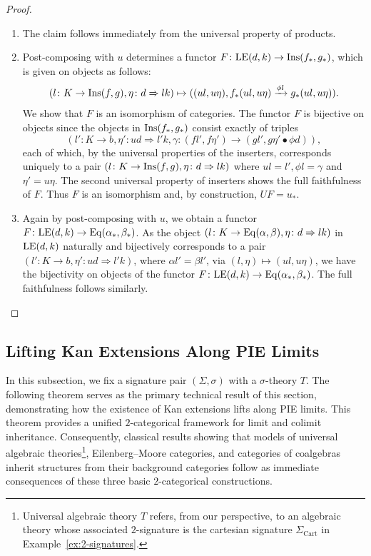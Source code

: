 \begin{proof}
    \hfill
    \begin{enumerate}
        \item The claim follows immediately from the universal property of products.
        \item Post-composing with $u$ determines a functor $F\colon \mathrm{LE}(d,k)\to \mathrm{Ins}(f_*,g_*)$, which is given on objects as follows: 
        $$
        (l\colon K\to \mathrm{Ins}(f,g),\eta\colon d\Rightarrow lk)\mapsto ((ul,u\eta), f_*(ul,u\eta)\xrightarrow{\phi l} g_*(ul,u\eta)).
        $$
        We show that $F$ is an isomorphism of categories. The functor $F$ is bijective on objects since the objects in $\mathrm{Ins}(f_*,g_*)$ consist exactly of triples 
        $$
        (l'\colon K\to b, \eta'\colon ud\Rightarrow l'k,  \gamma\colon (fl',f\eta')\to (gl',g\eta'\bullet \phi d)),
        $$
        each of which, by the universal properties of the inserters, corresponds uniquely to a pair $(l\colon K\to \mathrm{Ins}(f,g), \eta\colon d\Rightarrow lk)$ where $ul = l', \phi l = \gamma$ and $\eta' = u\eta$. The second universal property of inserters shows the full faithfulness of $F$. Thus $F$ is an isomorphism and, by construction, $UF = u_*$. 

        \item Again by post-composing with $u$, we obtain a functor $F\colon \mathrm{LE}(d,k)\to \mathrm{Eq}(\alpha_*,\beta_*)$. As the object $(l\colon K\to \mathrm{Eq}(\alpha,\beta), \eta\colon d\Rightarrow lk)$ in $\mathrm{LE}(d,k)$ naturally and bijectively corresponds to a pair $(l'\colon K\to b, \eta'\colon ud\Rightarrow l'k)$, where $\alpha l' = \beta l'$, via $(l,\eta)\mapsto (ul,u\eta)$, we have the bijectivity on objects of the functor $F\colon \mathrm{LE}(d,k)\to \mathrm{Eq}(\alpha_*,\beta_*)$. The full faithfulness follows similarly.\qedhere
    \end{enumerate}
\end{proof}


\subsection{Lifting Kan Extensions Along PIE Limits}
In this subsection, we fix a signature pair $(\Sigma,\sigma)$ with a $\sigma$-theory $T$. The following theorem serves as the primary technical result of this section, demonstrating how the existence of Kan extensions lifts along PIE limits. This theorem provides a unified $2$-categorical framework for limit and colimit inheritance. Consequently, classical results showing that models of universal algebraic theories\footnote{Universal algebraic theory $T$ refers, from our perspective, to an algebraic theory whose associated $2$-signature is the cartesian signature $\Sigma_{\text{Cart}}$ in Example~\ref{ex:2-signatures}.}, Eilenberg--Moore categories, and categories of coalgebras inherit structures from their background categories follow as immediate consequences of these three basic $2$-categorical constructions.


